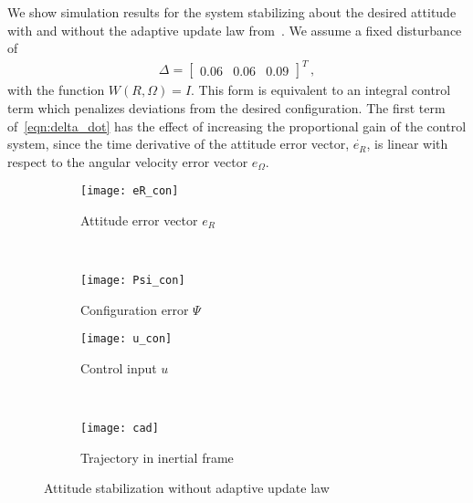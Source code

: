 \documentclass[letterpaper, 10 pt, conference]{ieeeconf}  %
\begin{document}
We show simulation results for the system stabilizing about the desired attitude with and without the adaptive update law from~.
We assume a fixed disturbance of 
\begin{gather*}
	\Delta = \begin{bmatrix} 0.06 & 0.06 & 0.09 \end{bmatrix}^T \, ,
\end{gather*}
with the function \( W(R,\Omega) = I \).
This form is equivalent to an integral control term which penalizes deviations from the desired configuration.
The first term of~\cref{eqn:delta_dot} has the effect of increasing the proportional gain of the control system, since the time derivative of the attitude error vector, \( \dot{e_{R}} \), is linear with respect to the angular velocity error vector \( e_\Omega\).
\begin{figure} 
	\centering 
	\begin{subfigure}[htbp]{0.5\columnwidth} 
		\texttt{[image: eR\_con]} 
		\caption{Attitude error vector \(e_R\) } \label{fig:eR_con} 
	\end{subfigure}~ %
	\begin{subfigure}[htbp]{0.5\columnwidth} 
		\texttt{[image: Psi\_con]} 
		\caption{Configuration error \( \Psi \)} \label{fig:Psi_con} 
	\end{subfigure}
	
	\begin{subfigure}[htbp]{0.5\columnwidth} 
		\texttt{[image: u\_con]} 
		\caption{Control input \( u\)} \label{fig:u_con} 
	\end{subfigure}~
	\begin{subfigure}[htbp]{0.5\columnwidth}
		\texttt{[image: cad]}
		\caption{Trajectory in inertial frame\label{fig:cad}}
	\end{subfigure}
	\caption{Attitude stabilization without adaptive update law}
	\label{fig:con} 
\end{figure}
\end{document}
